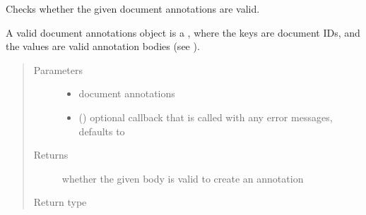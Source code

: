 \documentclass[letterpaper,10pt,english]{sphinxmanual}
\begin{document}
\begin{fulllineitems}
\label{\detokenize{autoapi/pine/client/models/index:pine.client.models.is_valid_doc_annotations}}
\sphinxAtStartPar
Checks whether the given document annotations are valid.

\sphinxAtStartPar
A valid document annotations object is a , where the keys are 
document IDs, and the values are valid annotation bodies (see {\hyperref[\detokenize{autoapi/pine/client/models/index:pine.client.models.is_valid_annotation}]{}}).
\begin{quote}\begin{description}
\item[{Parameters}] \leavevmode\begin{itemize}
\item {} 
\sphinxAtStartPar
{} \textendash{} document annotations

\item {} 
\sphinxAtStartPar
{} (\sphinxstyleliteralemphasis{\sphinxupquote{, }}) \textendash{} optional callback that is called with any error messages, defaults to 

\end{itemize}

\item[{Returns}] \leavevmode
\sphinxAtStartPar
whether the given body is valid to create an annotation

\item[{Return type}] \leavevmode
\sphinxAtStartPar
{}

\end{description}\end{quote}

\end{fulllineitems}
\end{document}
